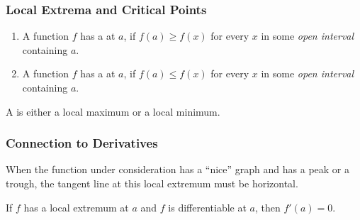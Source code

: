 \documentclass[10pt,t,handout,ignorenonframetext,aspectratio=169]{beamer}
\title[\course]{\lecTitle}
\institute[Ohio State]
{
  \medskip
}
\date[\week]{\semester}
\author{Tae Eun Kim, Ph.D.}
\begin{document}
\begin{frame}
  \titlepage
\end{frame}


\begin{frame}
  \frametitle{Local Extrema and Critical Points}

  \begin{defn}
    \begin{enumerate}
    \item A function $f$ has a  at $a$, if $f(a)\ge
      f(x)$ for every $x$ in some {\it open interval\/} containing $a$.
    \item A function $f$ has a  at $a$, if $f(a)\le
      f(x)$ for every $x$  in some {\it open interval\/} containing $a$.
    \end{enumerate}
    A  is either a local maximum or a local minimum.
  \end{defn}

\end{frame}

\begin{frame}
  \frametitle{Connection to Derivatives}
  When the function under consideration has a ``nice'' graph and has a
  peak or a trough, the tangent line at this local extremum must be
  horizontal.

  \begin{thm}
    If $f$ has a local extremum at $a$ and $f$ is differentiable
    at $a$, then $f'(a)=0$.
  \end{thm}

\end{frame}
\end{document}

